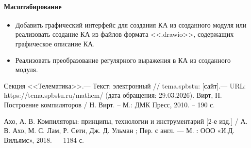 \documentclass[a4paper,final]{article}
\begin{document}
\paragraph{Масштабирование}
\begin{itemize}
    \item Добавить графический интерфейс для создания КА из созданного модуля или реализовать создание КА из файлов формата <<.drawio>>, содержащих графическое описание КА.
    \item Реализовать преобразование регулярного выражения в КА из созданного модуля.
\end{itemize}

\newpage
{}
\begin{thebibliography}{}
     Секция <<Телематика>>.— Текст: электронный // tema.spbstu: [сайт].— URL: https://tema.spbstu.ru/mathem/ (дата обращения: 29.03.2026).
     Вирт, Н. Построение компиляторов / Н. Вирт. – М.: ДМК Пресс, 2010. – 190 с.

     Ахо, А. В. Компиляторы: принципы, технологии и инструментарий [2-е изд.] / А. В. Ахо, М. С. Лам, Р. Сети, Дж. Д. Ульман ; Пер. с англ. — М. : ООО «И.Д. Вильямс», 2018. — 1184 с.
\end{thebibliography}






\newpage
\end{document}
